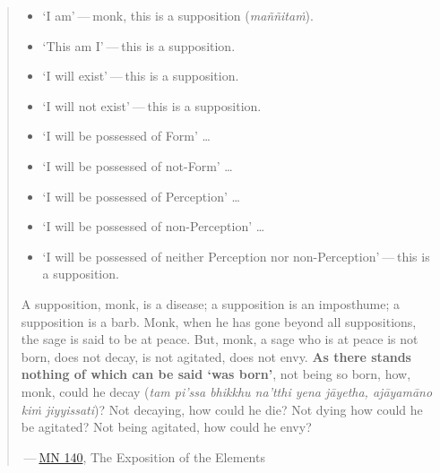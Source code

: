 \begin{quote}
\begin{itemize}
\item
  `I am' --- monk, this is a supposition (\emph{maññitaṁ}).
\item
  `This am I' --- this is a supposition.
\item
  `I will exist' --- this is a supposition.
\item
  `I will not exist' --- this is a supposition.
\item
  `I will be possessed of Form' \ldots\hspace{0pt}
\item
  `I will be possessed of not-Form' \ldots\hspace{0pt}
\item
  `I will be possessed of Perception' \ldots\hspace{0pt}
\item
  `I will be possessed of non-Perception' \ldots\hspace{0pt}
\item
  `I will be possessed of neither Perception nor non-Perception' --- this is a supposition.
\end{itemize}

A supposition, monk, is a disease; a supposition is an imposthume; a supposition is a barb. Monk, when he has gone beyond all suppositions, the sage is said to be at peace. But, monk, a sage who is at peace is not born, does not decay, is not agitated, does not envy. \textbf{As there stands nothing of which can be said `was born'}, not being so born, how, monk, could he decay (\emph{tam pi'ssa bhikkhu na'tthi yena jāyetha, ajāyamāno kiṁ jiyyissati})? Not decaying, how could he die? Not dying how could he be agitated? Not being agitated, how could he envy?

 --- \href{https://suttacentral.net/mn140/en/bodhi}{MN 140}, The Exposition of the Elements
\end{quote}

